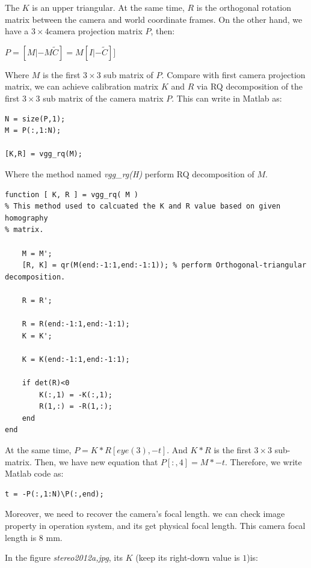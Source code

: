 \documentclass[12pt]{article}
\begin{document}
The $K$ is an upper triangular. At the same time, $R$ is the orthogonal rotation matrix between the camera and world coordinate frames. On the other hand, we have a $3 \times 4$camera projection matrix $P$, then:

\begin{center}
$P = [M | -M\tilde{C}] = M[I | -\tilde{C}]]$
\end{center}

Where $M$ is the first $3 \times 3$ sub matrix of $P$. Compare with first camera projection matrix, we can achieve calibration matrix $K$ and $R$ via RQ decomposition of the first $3 \times 3$ sub matrix of the camera matrix $P$. This can write in Matlab as:

\begin{lstlisting}
N = size(P,1);
M = P(:,1:N);

[K,R] = vgg_rq(M);
\end{lstlisting}

Where the method named \textit{vgg\_rg(H)} perform RQ decomposition of $M$.

\begin{lstlisting}
function [ K, R ] = vgg_rq( M )
% This method used to calcuated the K and R value based on given homography
% matrix.

    M = M';
    [R, K] = qr(M(end:-1:1,end:-1:1)); % perform Orthogonal-triangular decomposition.
    
    R = R';

    R = R(end:-1:1,end:-1:1);
    K = K';
    
    K = K(end:-1:1,end:-1:1);
    
    if det(R)<0
        K(:,1) = -K(:,1);
        R(1,:) = -R(1,:);
    end
end
\end{lstlisting}

At the same time, $P = K*R[eye(3), -t]$. And $K*R$ is the first $3 \times 3$ sub-matrix. Then, we have new equation that $P[:, 4] = M*-t$. Therefore, we write Matlab code as:

\begin{lstlisting}
t = -P(:,1:N)\P(:,end);
\end{lstlisting}

Moreover, we need to recover the camera's focal length. we can check image property in operation system, and its get physical focal length. This camera focal length is $8$ mm.

In the figure \textit{stereo2012a,jpg}, its $K$ (keep its right-down value is $1$)is:
\end{document}

